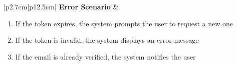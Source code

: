 \begin{table}[H]
\begin{tabular}{|p{2.7cm}|p{12.5cm}|}
        \textbf{Error Scenario} & \begin{minipage}[t]{\linewidth}
                                      \begin{enumerate}[topsep=0pt,itemsep=1pt,parsep=0pt,partopsep=0pt]
                                          \item If the token expires, the system prompts the user to request a new one
                                          \item If the token is invalid, the system displays an error message
                                          \item If the email is already verified, the system notifies the user
                                      \end{enumerate}
                                  \end{minipage} \\
        \hline
    \end{tabular}
    \label{tab:guest-verify-em}
\end{table}

\iffalse
